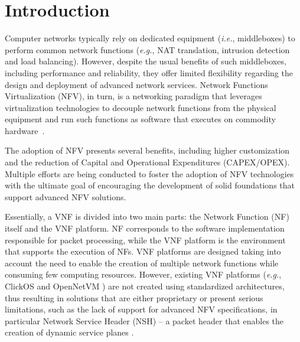 
\section{Introduction}\label{INTRO}

Computer networks typically rely on dedicated equipment (\textit{i.e.}, middleboxes) to perform common network functions (\textit{e.g.}, NAT translation, intrusion detection and load balancing). However, despite the usual benefits of such middleboxes, including performance and reliability, they offer limited flexibility regarding the design and deployment of advanced network services. Network Functions Virtualization (NFV), in turn, is a networking paradigm that leverages virtualization technologies to decouple network functions from the physical equipment and run such functions as software that executes on commodity hardware~\cite{ETSI-2012}.

The adoption of NFV presents several benefits, including higher customization and the reduction of Capital and Operational Expenditures (CAPEX/OPEX). Multiple efforts are being conducted to foster the adoption of NFV technologies with the ultimate goal of encouraging the development of solid foundations that support advanced NFV solutions.


Essentially, a VNF is divided into two main parts: the Network Function (NF) itself and the VNF platform.  NF corresponds to the software implementation responsible for packet processing, while the VNF platform is the environment that supports the execution of NFs. VNF platforms are designed taking into account the need to enable the creation of multiple network functions while consuming few computing resources. However, existing VNF platforms (\textit{e.g.}, ClickOS \cite{Martins-2014} and OpenNetVM \cite{Zhang-2016}) are not created using standardized architectures, thus resulting in solutions that are either proprietary or present serious limitations, such as the lack of support for advanced NFV specifications, in particular Network Service Header (NSH) -- a packet header that enables the creation of dynamic service planes \cite{Quinn-2018}.

